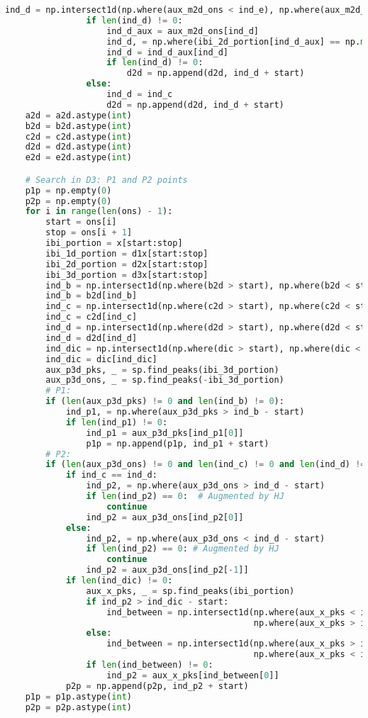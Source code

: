 \begin{lstlisting}[language=Python,label={lst:fidp.py}, basicstyle=\scriptsize]
                ind_d = np.intersect1d(np.where(aux_m2d_ons < ind_e), np.where(aux_m2d_ons > ind_c))
                if len(ind_d) != 0:
                    ind_d_aux = aux_m2d_ons[ind_d]
                    ind_d, = np.where(ibi_2d_portion[ind_d_aux] == np.min(ibi_2d_portion[ind_d_aux]))
                    ind_d = ind_d_aux[ind_d]
                    if len(ind_d) != 0:
                        d2d = np.append(d2d, ind_d + start)
                else:
                    ind_d = ind_c
                    d2d = np.append(d2d, ind_d + start)
    a2d = a2d.astype(int)
    b2d = b2d.astype(int)
    c2d = c2d.astype(int)
    d2d = d2d.astype(int)
    e2d = e2d.astype(int)

    # Search in D3: P1 and P2 points
    p1p = np.empty(0)
    p2p = np.empty(0)
    for i in range(len(ons) - 1):
        start = ons[i]
        stop = ons[i + 1]
        ibi_portion = x[start:stop]
        ibi_1d_portion = d1x[start:stop]
        ibi_2d_portion = d2x[start:stop]
        ibi_3d_portion = d3x[start:stop]
        ind_b = np.intersect1d(np.where(b2d > start), np.where(b2d < stop))
        ind_b = b2d[ind_b]
        ind_c = np.intersect1d(np.where(c2d > start), np.where(c2d < stop))
        ind_c = c2d[ind_c]
        ind_d = np.intersect1d(np.where(d2d > start), np.where(d2d < stop))
        ind_d = d2d[ind_d]
        ind_dic = np.intersect1d(np.where(dic > start), np.where(dic < stop))
        ind_dic = dic[ind_dic]
        aux_p3d_pks, _ = sp.find_peaks(ibi_3d_portion)
        aux_p3d_ons, _ = sp.find_peaks(-ibi_3d_portion)
        # P1:
        if (len(aux_p3d_pks) != 0 and len(ind_b) != 0):
            ind_p1, = np.where(aux_p3d_pks > ind_b - start)
            if len(ind_p1) != 0:
                ind_p1 = aux_p3d_pks[ind_p1[0]]
                p1p = np.append(p1p, ind_p1 + start)
        # P2:
        if (len(aux_p3d_ons) != 0 and len(ind_c) != 0 and len(ind_d) != 0):
            if ind_c == ind_d:
                ind_p2, = np.where(aux_p3d_ons > ind_d - start)
                if len(ind_p2) == 0:  # Augmented by HJ
                    continue
                ind_p2 = aux_p3d_ons[ind_p2[0]]
            else:
                ind_p2, = np.where(aux_p3d_ons < ind_d - start)
                if len(ind_p2) == 0: # Augmented by HJ
                    continue
                ind_p2 = aux_p3d_ons[ind_p2[-1]]
            if len(ind_dic) != 0:
                aux_x_pks, _ = sp.find_peaks(ibi_portion)
                if ind_p2 > ind_dic - start:
                    ind_between = np.intersect1d(np.where(aux_x_pks < ind_p2),
                                                 np.where(aux_x_pks > ind_dic - start))
                else:
                    ind_between = np.intersect1d(np.where(aux_x_pks > ind_p2),
                                                 np.where(aux_x_pks < ind_dic - start))
                if len(ind_between) != 0:
                    ind_p2 = aux_x_pks[ind_between[0]]
            p2p = np.append(p2p, ind_p2 + start)
    p1p = p1p.astype(int)
    p2p = p2p.astype(int)


\end{lstlisting}

